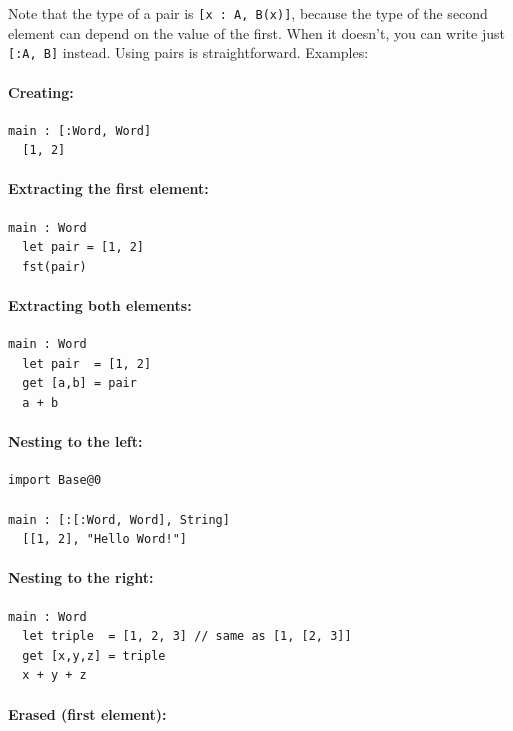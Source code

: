 \documentclass{article}
\theoremstyle{definition}
\theoremstyle{theorem}
\begin{document}
Note that the type of a pair is \verb|[x : A, B(x)]|, because the type of the
second element can depend on the value of the first. When it doesn't, you can
write just \verb|[:A, B]| instead. Using pairs is straightforward. Examples:

\paragraph{Creating:}

\begin{lstlisting}
main : [:Word, Word]
  [1, 2]
\end{lstlisting}

\paragraph{Extracting the first element:}

\begin{lstlisting}
main : Word
  let pair = [1, 2]
  fst(pair)
\end{lstlisting}

\paragraph{Extracting both elements:}

\begin{lstlisting}
main : Word
  let pair  = [1, 2]
  get [a,b] = pair
  a + b
\end{lstlisting}

\paragraph{Nesting to the left:}

\begin{lstlisting}
import Base@0

main : [:[:Word, Word], String]
  [[1, 2], "Hello Word!"]
\end{lstlisting}

\paragraph{Nesting to the right:}

\begin{lstlisting}
main : Word
  let triple  = [1, 2, 3] // same as [1, [2, 3]]
  get [x,y,z] = triple
  x + y + z
\end{lstlisting}

\paragraph{Erased (first element):}
\end{document}
